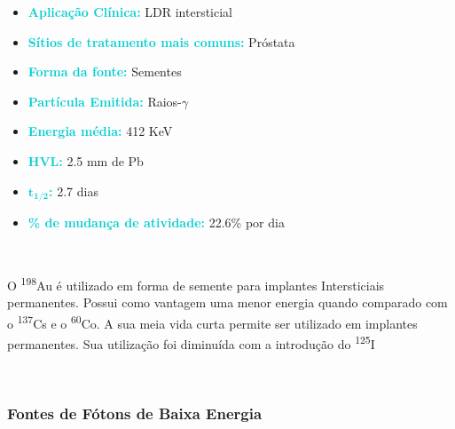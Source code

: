 \documentclass[11pt,a4paper]{article}
\begin{document}
		\begin{tcolorbox}[width=\textwidth, colback={white}, colbacktitle={DarkTurquoise!50!white}, title={$\bigstar$ \LobsterTwo{Ouro 198} $\bigstar$}, coltitle={CarnationPink}, colframe={DarkTurquoise}, fonttitle=\rmfamily\bfseries\Large, breakable]
			\begin{itemize}
				\item \textcolor{DarkTurquoise}{\textbf{Aplicação Clínica:}} LDR intersticial
				\item \textcolor{DarkTurquoise}{\textbf{Sítios de tratamento mais comuns:}} Próstata
				\item \textcolor{DarkTurquoise}{\textbf{Forma da fonte:}} Sementes
				\item \textcolor{DarkTurquoise}{\textbf{Partícula Emitida:}} Raios-$\gamma$
				\item \textcolor{DarkTurquoise}{\textbf{Energia média:}} 412 KeV
				\item \textcolor{DarkTurquoise}{\textbf{HVL:}} 2.5 mm de Pb
				\item \textcolor{DarkTurquoise}{\textbf{$\mathbf{t_{1/2}}$:}} 2.7 dias
				\item \textcolor{DarkTurquoise}{\textbf{\% de mudança de atividade:}} 22.6\% por dia
			\end{itemize}
		\end{tcolorbox}
			\

			O \textsuperscript{198}Au é utilizado em forma de semente para implantes Intersticiais permanentes. Possui como vantagem uma menor energia quando comparado com o \textsuperscript{137}Cs e o \textsuperscript{60}Co. A sua meia vida curta permite ser utilizado em implantes permanentes. Sua utilização foi diminuída com a introdução do \textsuperscript{125}I

			\

\subsubsection*{Fontes de  Fótons de Baixa Energia}
\end{document}
